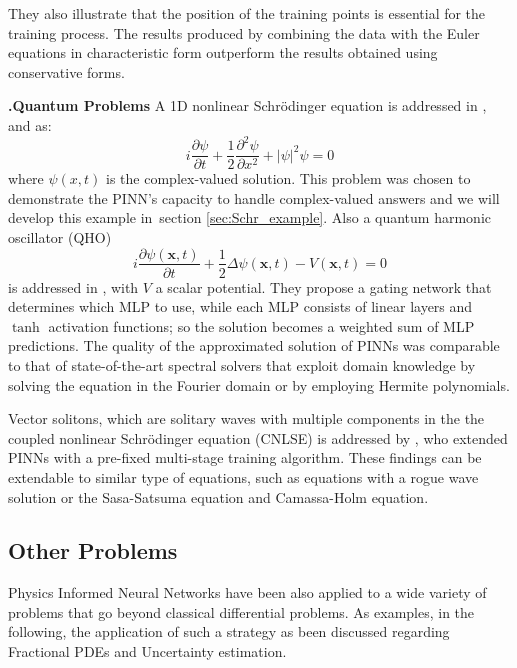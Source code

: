 \documentclass[pdflatex,sn-basic]{sn-jnl}%
\theoremstyle{thmstyleone}%
\theoremstyle{thmstyletwo}%
\theoremstyle{thmstylethree}%
\newcounter{paranum}[subsubsection]
\newcommand{\subsubsubsection}{\vspace{10pt}\noindent\textbf{\thesubsubsection.\refstepcounter{paranum}\theparanum\;}\textbf}
\begin{document}
They also illustrate that the position of the training points is essential for the training process.
The results produced by combining the data with the Euler equations in characteristic form outperform the results obtained using conservative forms. 

\subsubsubsection{Quantum Problems}
A 1D nonlinear Schr\"{o}dinger equation is addressed in  \cite{Rai2018_DeepHiddenPhysics_Rai}, and  \cite{Rai2019_PhysicsInformedNeural_PerRPK} as:
\begin{equation}\label{eq:Schrodinger}
    i\frac{\partial \psi}{\partial t} + 
    \frac{1}{2} \frac{\partial^2 \psi}{\partial x^2}
    + \lvert\psi\rvert^2 \psi = 0
\end{equation}
where $\psi(x,t)$ is the complex-valued solution.
This problem was chosen to demonstrate the PINN's capacity to handle complex-valued answers and we will develop this example in~section \ref{sec:Schr_example}.
Also a quantum harmonic oscillator (QHO) 
\begin{equation*}
i \frac{\partial \psi (\bm{x},t)}{\partial t} 
+
\frac{1}{2}\varDelta \psi (\bm{x},t) - V(\bm{x},t) = 0
\end{equation*}
is addressed in \cite{Sti2020_LargeScaleNeural_BetSBB}, with $V$ a scalar potential.
They propose a gating network that determines which MLP to use, while each MLP consists of linear layers and $\tanh$ activation functions; so the solution becomes a weighted sum of MLP predictions. 
The quality of the approximated solution of PINNs was comparable to that of state-of-the-art spectral solvers that exploit domain knowledge by solving the equation in the Fourier domain or by employing Hermite polynomials. 

Vector solitons, which are solitary waves with multiple components in the the coupled nonlinear Schrödinger equation (CNLSE) is addressed by
\cite{Mo2022_DataDrivenVector_LinMLZ}, who extended PINNs with a pre-fixed multi-stage training algorithm. These findings can be extendable to similar type of equations, such as equations with a rogue wave \citep{Wan2021_DataDrivenRogue_YanWY} solution or the Sasa-Satsuma equation and Camassa-Holm equation.

\subsection{Other Problems}
Physics Informed Neural Networks have been also applied to a wide variety of problems that go beyond classical differential problems. As examples, in the following, the application of such a strategy as been discussed regarding Fractional PDEs and Uncertainty estimation. 
\end{document}
